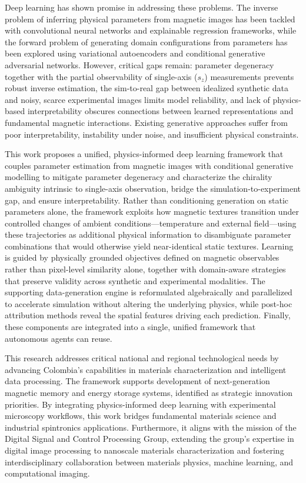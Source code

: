 \documentclass[letterpaper, 12, one column]{article}
\begin{document}
Deep learning has shown promise in addressing these problems. The inverse problem of inferring physical parameters from magnetic images has been tackled with convolutional neural networks and explainable regression frameworks, while the forward problem of generating domain configurations from parameters has been explored using variational autoencoders and conditional generative adversarial networks. However, critical gaps remain: parameter degeneracy together with the partial observability of single-axis ($s_z$) measurements prevents robust inverse estimation, the sim-to-real gap between idealized synthetic data and noisy, scarce experimental images limits model reliability, and lack of physics-based interpretability obscures connections between learned representations and fundamental magnetic interactions. Existing generative approaches suffer from poor interpretability, instability under noise, and insufficient physical constraints.

This work proposes a unified, physics-informed deep learning framework that couples parameter estimation from magnetic images with conditional generative modelling to mitigate parameter degeneracy and characterize the chirality ambiguity intrinsic to single-axis observation, bridge the simulation-to-experiment gap, and ensure interpretability. Rather than conditioning generation on static parameters alone, the framework exploits how magnetic textures transition under controlled changes of ambient conditions—temperature and external field—using these trajectories as additional physical information to disambiguate parameter combinations that would otherwise yield near-identical static textures. Learning is guided by physically grounded objectives defined on magnetic observables rather than pixel-level similarity alone, together with domain-aware strategies that preserve validity across synthetic and experimental modalities. The supporting data-generation engine is reformulated algebraically and parallelized to accelerate simulation without altering the underlying physics, while post-hoc attribution methods reveal the spatial features driving each prediction. Finally, these components are integrated into a single, unified framework that autonomous agents can reuse.

This research addresses critical national and regional technological needs by advancing Colombia's capabilities in materials characterization and intelligent data processing. The framework supports development of next-generation magnetic memory and energy storage systems, identified as strategic innovation priorities. By integrating physics-informed deep learning with experimental microscopy workflows, this work bridges fundamental materials science and industrial spintronics applications. Furthermore, it aligns with the mission of the Digital Signal and Control Processing Group, extending the group's expertise in digital image processing to nanoscale materials characterization and fostering interdisciplinary collaboration between materials physics, machine learning, and computational imaging.
\end{document}
